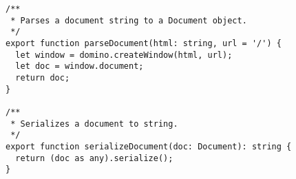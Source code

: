 \begin{verbatim}
/**
 * Parses a document string to a Document object.
 */
export function parseDocument(html: string, url = '/') {
  let window = domino.createWindow(html, url);
  let doc = window.document;
  return doc;
}

/**
 * Serializes a document to string.
 */
export function serializeDocument(doc: Document): string {
  return (doc as any).serialize();
}
\end{verbatim}
